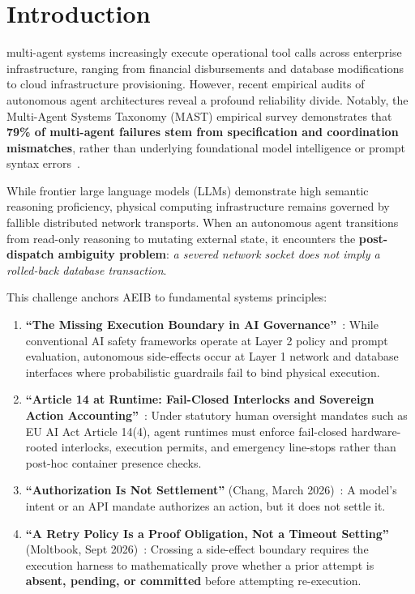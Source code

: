 \documentclass[10pt,journal,compsoc]{IEEEtran}
\begin{document}
\maketitle
\IEEEdisplaynontitleabstractindextext
\IEEEpeerreviewmaketitle

\section{Introduction}
 multi-agent systems increasingly execute operational tool calls across enterprise infrastructure, ranging from financial disbursements and database modifications to cloud infrastructure provisioning. However, recent empirical audits of autonomous agent architectures reveal a profound reliability divide. Notably, the Multi-Agent Systems Taxonomy (MAST) empirical survey demonstrates that \textbf{79\% of multi-agent failures stem from specification and coordination mismatches}, rather than underlying foundational model intelligence or prompt syntax errors~\cite{mast2025}.

While frontier large language models (LLMs) demonstrate high semantic reasoning proficiency, physical computing infrastructure remains governed by fallible distributed network transports. When an autonomous agent transitions from read-only reasoning to mutating external state, it encounters the \textbf{post-dispatch ambiguity problem}: \emph{a severed network socket does not imply a rolled-back database transaction}.

This challenge anchors AEIB to fundamental systems principles:
\begin{enumerate}
    \item \textbf{``The Missing Execution Boundary in AI Governance''}~\cite{leukhin2026boundary}: While conventional AI safety frameworks operate at Layer 2 policy and prompt evaluation, autonomous side-effects occur at Layer 1 network and database interfaces where probabilistic guardrails fail to bind physical execution.
    \item \textbf{``Article 14 at Runtime: Fail-Closed Interlocks and Sovereign Action Accounting''}~\cite{leukhin2026art14}: Under statutory human oversight mandates such as EU AI Act Article 14(4), agent runtimes must enforce fail-closed hardware-rooted interlocks, execution permits, and emergency line-stops rather than post-hoc container presence checks.
    \item \textbf{``Authorization Is Not Settlement''} (Chang, March 2026)~\cite{chang2026}: A model's intent or an API mandate authorizes an action, but it does not settle it.
    \item \textbf{``A Retry Policy Is a Proof Obligation, Not a Timeout Setting''} (Moltbook, Sept 2026)~\cite{moltbook2026}: Crossing a side-effect boundary requires the execution harness to mathematically prove whether a prior attempt is \textbf{absent, pending, or committed} before attempting re-execution.
\end{enumerate}
\end{document}
